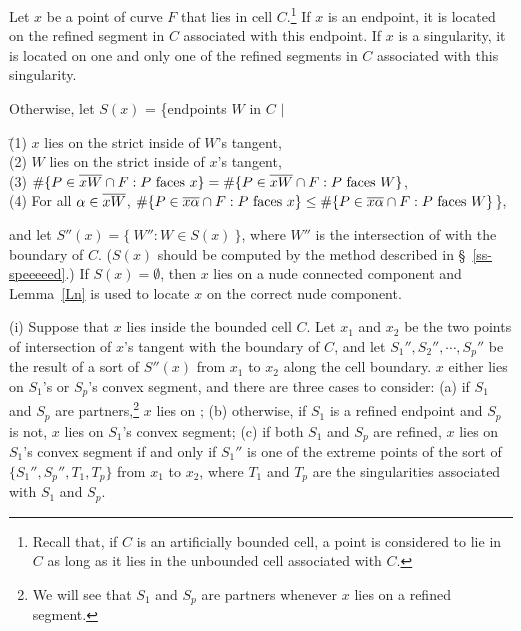 \begin{theorem}
\label{Tps}
Let $x$ be a point of curve $F$ that lies in 
cell $C$.\footnote{Recall that, 
	if $C$ is an artificially bounded cell,
	a point is considered to lie in $C$ as long as it lies in the 
	unbounded cell
	associated with $C$.}
If $x$ is an endpoint, it is located on the refined segment in 
$C$ associated
with this endpoint.
If $x$ is a singularity,
it is located on one and only one of the refined segments in $C$ 
associated with this 
singularity.

Otherwise, let $S(x)$ = \{endpoints $W$ in $C$ $\mid$
\begin{tabbing}
\indent \= {\rm (1)} $x$ lies on the strict inside of $W$'s tangent,\\
\> {\rm (2)} $W$ lies on the strict inside of $x$'s tangent,\\
\> {\rm (3)} \mbox{$\#\{P \in\mbox{$\overline{xW}$}\cap F: P \mbox{ faces $x$}\} =
\#\{P \in \mbox{$\overline{xW}$}\cap F: P \mbox{ faces $W$} \}$},\\
\> {\rm (4)} For all $\alpha \in \mbox{$\overline{xW}$}$,
$\#\{P \in\mbox{$\overline{x\alpha}$}\cap F: P \mbox{ faces $x$}\} \leq
\#\{P \in \mbox{$\overline{x\alpha}$}\cap F: P \mbox{ faces $W$}\}$\},
\end{tabbing}
%
\noindent and let $S''(x) = \{\ W'' : W \in S(x)\ \}$, where $W''$ is 
the intersection 
of  with the boundary of $C$.
{\rm (}$S(x)$ should be computed by the method described 
in \S~{\rm\ref{ss-speeeeed}.)}
If $S(x) = \emptyset$, then $x$ lies on a nude connected component 
and Lemma~{\rm\ref{Ln}}
is used to locate $x$ on the correct nude component.

{\rm (i)} Suppose that $x$ lies inside the bounded cell $C$.
Let $x_{1}$ and $x_{2}$ be the two points of intersection of $x$'s 
tangent with the
boundary of $C$, 
and let $S_{1}'',S_{2}'',\cdots,S_{p}''$ be the result of a sort 
of $S''(x)$ 
from $x_{1}$ to $x_{2}$ along the cell boundary.
$x$ either lies on $S_{1}$'s or $S_{p}$'s convex segment,
% 
%
and there are three cases to consider:
{\rm (a)} if $S_{1}$ and $S_{p}$ are partners,\footnote{We will see 
	that $S_{1}$ and $S_{p}$ 
	are partners whenever $x$ lies on a refined segment.}
$x$ lies on ;
{\rm (b)} otherwise, if $S_{1}$ is a refined endpoint and 
$S_{p}$ is not, $x$ lies on $S_{1}$'s convex segment;
{\rm (c)} if both $S_{1}$ and $S_{p}$ are refined,
$x$ lies on $S_{1}$'s convex segment if and only if 
$S_{1}''$ is one of the extreme points of the sort
of $\{S_{1}'',S_{p}'',T_{1},T_{p}\}$ from $x_{1}$ to $x_{2}$, where
$T_{1}$ and $T_{p}$ are the singularities
associated with $S_{1}$ and $S_{p}$.


\end{theorem}
